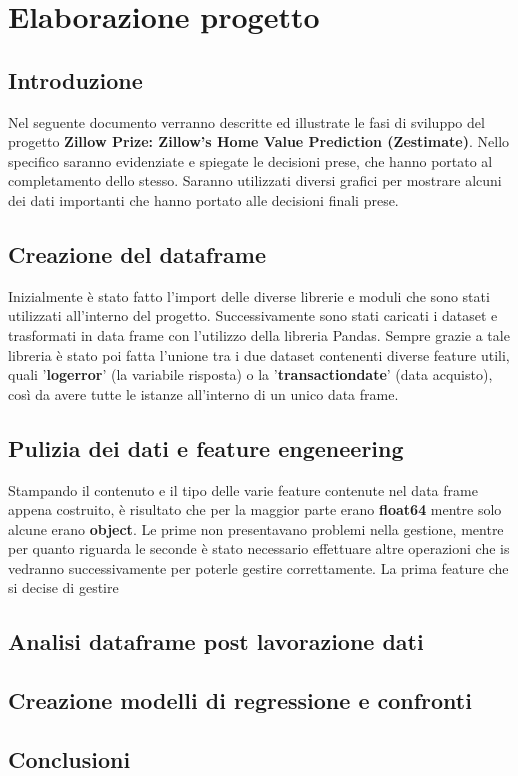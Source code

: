 \chapter{Elaborazione progetto}

\section{Introduzione}

Nel seguente documento verranno descritte ed illustrate le fasi di sviluppo del progetto \textbf{Zillow Prize: Zillow’s Home Value Prediction (Zestimate)}.
Nello specifico saranno evidenziate e spiegate le decisioni prese, che hanno portato al completamento dello stesso.
Saranno utilizzati diversi grafici per mostrare alcuni dei dati importanti che hanno portato alle decisioni finali prese.

\section{Creazione del dataframe}
Inizialmente è stato fatto l'import delle diverse librerie e moduli che sono stati utilizzati all'interno del progetto.
Successivamente sono stati caricati i dataset e trasformati in data frame con l'utilizzo della libreria Pandas. Sempre grazie a tale libreria è stato poi fatta 
l'unione tra i due dataset contenenti diverse feature utili, quali '\textbf{logerror}' (la variabile risposta) o la '\textbf{transactiondate}' (data acquisto), così da avere tutte 
le istanze all'interno di un unico data frame.

\section{Pulizia dei dati e feature engeneering}
Stampando il contenuto e il tipo delle varie feature contenute nel data frame appena costruito, è risultato che per la maggior parte erano \textbf{float64} mentre solo alcune erano 
\textbf{object}. Le prime non presentavano problemi nella gestione, mentre per quanto riguarda le seconde è stato necessario effettuare altre operazioni che is vedranno successivamente 
per poterle gestire correttamente.
La prima feature che si decise di gestire 

\section{Analisi dataframe post lavorazione dati}

\section{Creazione modelli di regressione e confronti}

\section{Conclusioni}
